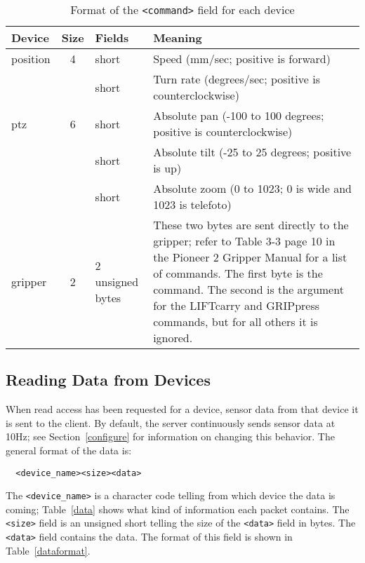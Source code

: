\documentclass[11pt]{article}
\begin{document}
\begin{table}

\begin{center}
\begin{tabularx}{\columnwidth}{|l|c|l|X|}

\hline
Device & Size & Fields & Meaning \\
\hline
position & 4 & short & 
Speed (mm/sec; positive is forward) \\
& & short &
Turn rate (degrees/sec; positive is counterclockwise)\\
\hline
ptz & 6 &  short & 
Absolute pan (-100 to 100 degrees; positive is counterclockwise) \\
& & short &
Absolute tilt (-25 to 25 degrees; positive is up) \\
& & short &
Absolute zoom (0  to 1023; 0 is wide and 1023 is telefoto) \\
\hline
gripper & 2 & 2 unsigned bytes & 
These two bytes are sent directly to the gripper; refer to Table 3-3
page 10 in the Pioneer 2 Gripper Manual\cite{gripman} 
for a list of commands. The first byte
is the command. The second is the argument for the LIFTcarry and GRIPpress 
commands, but for all others it is ignored.\\
\hline
\end{tabularx}
\end{center}
\caption{Format of the {\tt <command>} field for each device}
\label{commands}
\end{table}

\subsection{Reading Data from Devices}
\label{readdata}

When read access has been requested for a device, sensor data from
that device it is sent to the client. 
By default, the server continuously sends sensor data at 10Hz; see 
Section~\ref{configure} for information on changing this behavior.
The general format of the data is:
\begin{verbatim}
  <device_name><size><data>
\end{verbatim}

The {\tt <device\_name>} is a character code telling from which device the data
is coming; Table~\ref{data} shows what kind of information each packet 
contains.  The {\tt <size>} field is 
an unsigned short telling the size of the {\tt <data>} field in bytes. The 
{\tt <data>} field contains the data. The format
of this field is shown in Table~\ref{dataformat}. 
\end{document}
